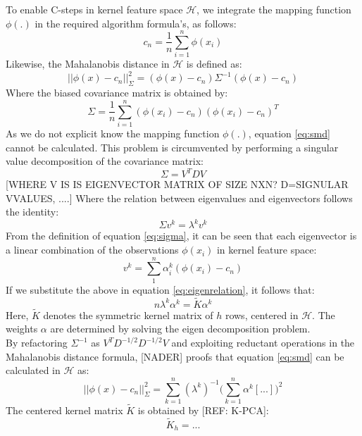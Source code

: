 \documentclass[preprint,12pt]{elsarticle}
\begin{document}
To enable C-steps in kernel feature space  $\mathcal{H}$, we integrate the mapping function $\phi(.)$ in the required algorithm formula's, as follows: 
\begin{equation}
	\label{eq:center}
	c_n = \frac{1}{n} \sum_{i=1}^{n}\phi(x_i)
\end{equation}
Likewise, the Mahalanobis distance in $\mathcal{H}$ is defined as:
\begin{equation}
	\label{eq:smd}
	||\phi(x) - c_n||^2_{\Sigma} = (\phi(x) - c_n) \Sigma^{-1} (\phi(x) - c_n)
\end{equation}
Where the biased covariance matrix is obtained by:
\begin{equation}
	\Sigma = \frac{1}{n} \sum_{i=1}^{n} (\phi(x_i) - c_n) (\phi(x_i) - c_n)^T
	\label{eq:sigma}
\end{equation}
As we do not explicit know the mapping function $\phi(.)$, equation \ref{eq:smd} cannot be calculated. This problem is circumvented by performing a singular value decomposition of the covariance matrix:
\begin{equation}
	\Sigma = V^T D V
\end{equation}
[WHERE V IS IS EIGENVECTOR MATRIX OF SIZE NXN? D=SIGNULAR VVALUES, ....]
Where the relation between eigenvalues and eigenvectors follows the identity:
\begin{equation}
	\label{eq:eigenrelation}
	\Sigma v^k = \lambda^k v^k
\end{equation} 
From the definition of equation \ref{eq:sigma}, it can be seen that each eigenvector is a linear combination of the observations $\phi(x_i)$ in kernel feature space:
\begin{equation}
v^k = \sum_{1}^{n} \alpha_i^k ( \phi(x_i) - c_n) 
\end{equation}
If we substitute the above in equation \ref{eq:eigenrelation}, it follows that:
\begin{equation}
	n \lambda^k \alpha^k = \tilde{K} \alpha^k
\end{equation}
Here, $\tilde{K}$ denotes the symmetric kernel matrix of $h$ rows, centered in $\mathcal{H}$. The weights $\alpha$ are determined by solving the eigen decomposition problem. \\
By refactoring $\Sigma^{-1}$ as $V^T D^{-1/2} D^{-1/2} V$ and exploiting reductant operations in the Mahalanobis distance formula, [NADER] proofs that equation \ref{eq:smd} can be calculated in $\mathcal{H}$ as:
\begin{equation}
	||\phi(x) - c_n||^2_{\Sigma} = \sum_{k=1}^{n} (\lambda^k)^{-1} \big( \sum_{k=1}^{n} \alpha^k [...]    \big)^2
\end{equation}	
The centered kernel matrix $\tilde{K}$ is obtained by [REF: K-PCA]:
\begin{equation}
	\tilde{K}_h = ...
\end{equation}
\end{document}
